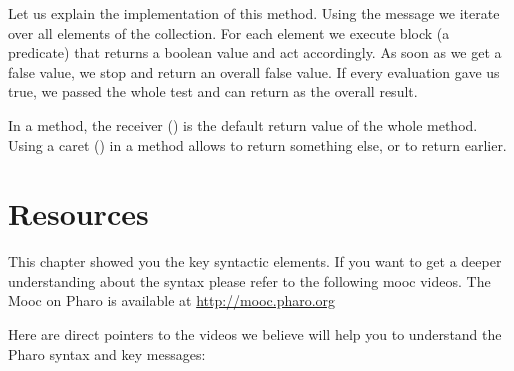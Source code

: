 \documentclass[10pt,twoside,english]{_support/latex/sbabook/sbabook}
\begin{document}
Let us explain the implementation of this method. Using the message  we iterate over all elements of the collection. For each element we execute block (a predicate) that returns a boolean value and act accordingly. As soon as we get a false value, we stop and return an overall false value. If every evaluation gave us true, we passed the whole test and can return  as the overall result.

In a method, the receiver () is the default return value of the whole method. Using a caret (\textcode{\string^}) in a method allows to return something else, or to return earlier.
\section{Resources}
This chapter showed you the key syntactic elements. If you want to get a deeper understanding about the syntax please refer to the following mooc videos. The Mooc on Pharo is available at \url{http://mooc.pharo.org}

Here are direct pointers to the videos we believe will help you to understand the Pharo syntax and key messages: 
\end{document}
